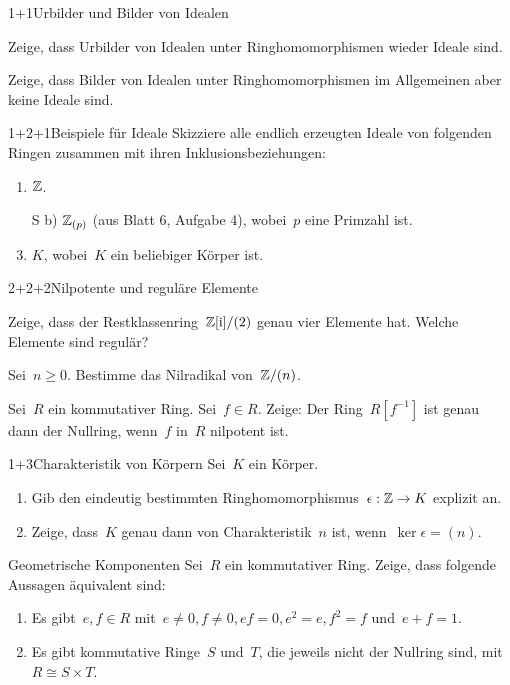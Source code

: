 \documentclass{algblatt}
\begin{document}

\begin{aufgabeE}{1+1}{Urbilder und Bilder von Idealen}
\item Zeige, dass Urbilder von Idealen unter Ringhomomorphismen wieder Ideale
sind.
\item Zeige, dass Bilder von Idealen unter Ringhomomorphismen im Allgemeinen
aber keine Ideale sind.
\end{aufgabeE}

\begin{aufgabe}{1+2+1}{Beispiele für Ideale}
Skizziere alle endlich erzeugten Ideale von folgenden Ringen zusammen mit ihren
Inklusionsbeziehungen:
\begin{enumerate}
\item $\mathbb{Z}$.
\item[S b)] $\mathbb{Z}_{(p)}$ (aus Blatt 6, Aufgabe 4), wobei~$p$ eine Primzahl ist.
\item $K$, wobei~$K$ ein beliebiger Körper ist.
\end{enumerate}
\end{aufgabe}

\begin{aufgabeE}{2+2+2}{Nilpotente und reguläre Elemente}
\item Zeige, dass der Restklassenring~$\mathbb{Z}[\mathrm{i}]/(2)$ genau vier Elemente hat.
Welche Elemente sind regulär?
\item Sei~$n \geq 0$. Bestimme das Nilradikal von~$\mathbb{Z}/(n)$.
\item Sei~$R$ ein kommutativer Ring. Sei~$f \in R$. Zeige: Der Ring~$R[f^{-1}]$ ist
genau dann der Nullring, wenn~$f$ in~$R$ nilpotent ist.
\end{aufgabeE}

\begin{aufgabe}{1+3}{Charakteristik von Körpern}
Sei~$K$ ein Körper.
\begin{enumerate}
\item Gib den eindeutig bestimmten Ringhomomorphismus~$\epsilon : \mathbb{Z} \to K$
explizit an.
\item Zeige, dass~$K$ genau dann von Charakteristik~$n$ ist, wenn~$\ker
\epsilon = (n)$.
\end{enumerate}
\end{aufgabe}

\begin{aufgabe}{4}{Geometrische Komponenten}
Sei~$R$ ein kommutativer Ring. Zeige, dass folgende Aussagen äquivalent sind:
\begin{enumerate}
\item Es gibt~$e, f \in R$ mit~$e \neq 0, f \neq 0, ef = 0, e^2 = e, f^2 = f$
und~$e + f = 1$.
\item Es gibt kommutative Ringe~$S$ und~$T$, die jeweils nicht der Nullring
sind, mit~$R \cong S \times T$.
\end{enumerate}
\end{aufgabe}
\end{document}
